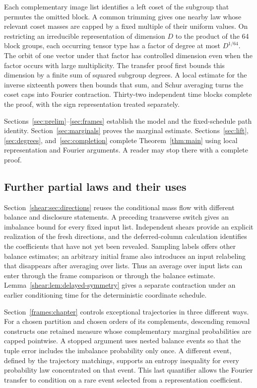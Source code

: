 Each complementary image list identifies a left coset of the subgroup
that permutes the omitted block. A common trimming gives one nearby law
whose relevant coset masses are capped by a fixed multiple of their
uniform values. On restricting an
irreducible representation of dimension $D$ to the product of the 64
block groups, each occurring tensor type has a factor of degree at most
$D^{1/64}$. The orbit of one vector under
that factor has controlled dimension even when the factor occurs with
large multiplicity. The transfer proof first bounds this dimension
by a finite sum of squared subgroup degrees. A local estimate for
the inverse sixteenth powers then bounds that sum, and Schur averaging
turns the coset caps into Fourier contraction. Thirty-two independent
time blocks complete the proof, with the sign representation treated
separately.

Sections~\ref{sec:prelim}--\ref{sec:frames} establish the model and
the fixed-schedule path identity. Section~\ref{sec:marginals} proves
the marginal estimate. Sections~\ref{sec:lift}, \ref{sec:degrees},
and~\ref{sec:completion} complete Theorem~\ref{thm:main} using local
representation and Fourier arguments. A reader may stop there with a
complete proof.

\subsection{Further partial laws and their uses}

Section~\ref{shear:sec:directions} reuses the conditional mass flow with
different balance and disclosure statements. A preceding transverse
switch gives an imbalance bound for every fixed input list. Independent
shears provide an explicit realization of the fresh directions, and
the deferred-column calculation identifies the coefficients that have
not yet been revealed. Sampling labels offers other balance estimates;
an arbitrary initial frame also introduces an input relabeling that
disappears after averaging over lists. Thus an average over input lists
can enter through the frame comparison or through the balance estimate.
Lemma~\ref{shear:lem:delayed-symmetry} gives a separate contraction under an earlier
conditioning time for the deterministic coordinate schedule.

Section~\ref{frames:chapter} controls exceptional trajectories in three different ways.
For a chosen partition and chosen orders of its complements, descending
removal constructs one retained measure whose complementary marginal
probabilities are capped pointwise. A stopped argument uses nested balance
events so that the tuple error includes the imbalance probability only
once. A different event, defined by the
trajectory matchings, supports an entropy inequality for every
probability law concentrated on that event. This last quantifier allows
the Fourier transfer to condition on a rare event selected from a
representation coefficient.

